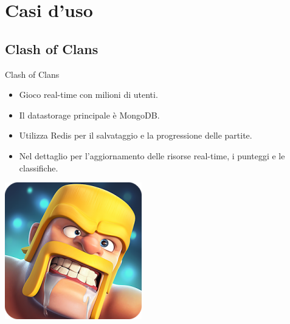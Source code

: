 \documentclass[xcolor=dvipsnames]{beamer}
\begin{document}
    \section{Casi d'uso}
      \begin{frame}
        \begin{block}{\centering \huge \insertsectionhead}
        \end{block}
      \end{frame}
      \subsection{Clash of Clans}
        \begin{frame}{Clash of Clans}
          \begin{itemize}
            \item Gioco real-time con milioni di utenti.
            \item Il datastorage principale è MongoDB.
            \item Utilizza Redis per il salvataggio e la progressione delle partite.
            \item Nel dettaglio per l'aggiornamento delle risorse real-time, i punteggi e le classifiche.
          \end{itemize}
          \begin{center}
          \includegraphics[height=3.cm]{res/clash.png}
          \end{center}
        \end{frame}
\end{document}
